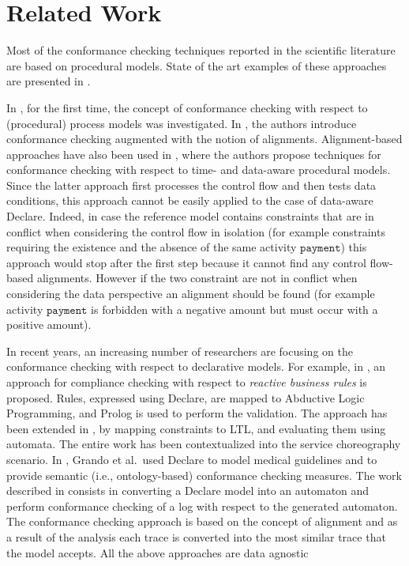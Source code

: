 \section{Related Work}
\label{sec:related}

Most of the conformance checking techniques reported in the scientific literature are based on procedural models. State of the art examples of these approaches are presented in \cite{DBLP:journals/tosem/CookW99,RozinatA08,DBLP:conf/edoc/AdriansyahDA11,LeoniA13,MultiPerspective,RamezaniTaghiabadi2013,Taghiabadi2014}.

In \cite{DBLP:journals/tosem/CookW99,RozinatA08}, for the first time, the concept of conformance checking with respect to (procedural) process models was investigated. In \cite{DBLP:conf/edoc/AdriansyahDA11}, the authors introduce conformance checking augmented with the notion of alignments.
Alignment-based approaches have also been used in \cite{LeoniA13,MultiPerspective,RamezaniTaghiabadi2013,Taghiabadi2014}, where the authors propose techniques for conformance checking with respect to time- and data-aware procedural models.
Since the latter approach first processes the control flow and then tests data conditions, this approach cannot be easily applied to the case of data-aware Declare. Indeed, in case the reference model contains constraints that are in conflict when considering the control flow in isolation (for example constraints requiring the existence and the absence of the same activity $\texttt{payment}$) this approach would stop after the first step because it cannot find any control flow-based alignments. However if the two constraint are not in conflict when considering the data perspective an alignment should be found (for example activity $\texttt{payment}$ is forbidden with a negative amount but must occur with a positive amount).


In recent years, an increasing number of researchers are focusing on the conformance checking with respect to declarative models.
For example, in \cite{Chesani2009}, an approach for compliance checking with respect to \emph{reactive business rules} is proposed. Rules, expressed using Declare, are mapped to Abductive Logic Programming, and Prolog is used to perform the validation. The approach has been extended in \cite{Montali2010:Choreographies}, by mapping constraints to LTL, and evaluating them using automata. The entire work has been contextualized into the service choreography scenario. In \cite{Grando2012,Grando2013}, Grando et al.\ used Declare to model medical guidelines and to provide semantic (i.e., ontology-based) conformance checking measures.
The work described in \cite{LeoniMA12} consists in converting a Declare model into an automaton and perform conformance checking of a log with respect to the generated automaton. The conformance checking approach is based on the concept of alignment and as a result of the analysis each trace is converted into the most similar trace that the model accepts. All the above approaches are data agnostic


